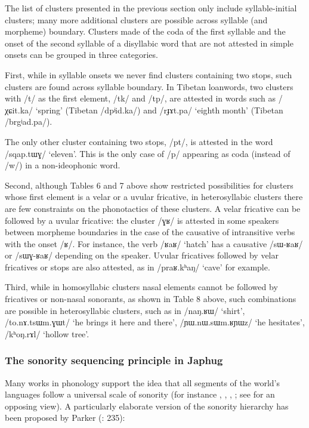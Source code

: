 \documentclass[12pt]{article}
\newcommand{\ipa}[1]{\mbox{\phon/#1/}}
\begin{document}
 The list of clusters presented in the previous section only include syllable-initial clusters; many more additional clusters are possible across syllable (and morpheme) boundary. Clusters made of the coda of the first syllable and the onset of the second syllable of a disyllabic word that are not attested in simple onsets can be grouped in three categories.
 
 First, while in syllable onsets we never find clusters containing two stops, such clusters are found across syllable boundary. In Tibetan loanwords, two clusters with \ipa{t} as the first element,  \ipa{tk} and \ipa{tp}, are attested in words such as \ipa{χɕit.ka} `spring' (Tibetan \ipa{dpʲid.ka}) and \ipa{rɟɤt.pa} `eighth month' (Tibetan \ipa{brgʲad.pa}). 
 
 The only  other cluster containing two stops, \ipa{pt}, is attested in the word  \ipa{sqap.tɯɣ} `eleven'. This is the only case of \ipa{p} appearing as coda (instead of \ipa{w}) in a non-ideophonic  word.
 
 Second, although Tables 6 and 7 above show restricted possibilities for clusters whose first element is a velar or a uvular fricative, in heterosyllabic clusters there are few constraints on the phonotactics of these clusters. A velar fricative can be followed by a uvular fricative:  the cluster \ipa{ɣʁ} is attested in some speakers between morpheme boundaries in the case of the causative of intransitive verbs with the onset \ipa{ʁ}. For instance, the verb \ipa{ʁaʁ} `hatch' has a causative \ipa{sɯ-ʁaʁ} or \ipa{sɯɣ-ʁaʁ} depending on the speaker. Uvular fricatives followed by velar fricatives or stops are also attested, as in \ipa{praʁ.kʰaŋ} `cave' for example.
 
Third, while in homosyllabic clusters nasal elements cannot be followed by fricatives or non-nasal sonorants, as shown in Table 8 above, such combinations are possible in heterosyllabic clusters, such as in \ipa{naŋ.ʁɯ} `shirt', \ipa{to.nɤ.tsɯm.ɣɯt} `he brings it here and there', \ipa{ɲɯ.nɯ.sɯm.ʁɲɯz} `he hesitates', \ipa{kʰoŋ.rɤl} `hollow tree'.

\subsubsection*{The sonority sequencing principle in Japhug}
Many works in phonology support the idea that all segments of the world's languages follow a universal scale of sonority (for instance \citealt{vennemann88syllable}, \citealt{blevins95syllable}, \citealt{parker02sonority}, \citealt{baroni14invariant}; see \citealt{ohala90sonority} for an opposing view). A particularly elaborate version of the sonority hierarchy has been proposed by Parker (\citeyear{parker02sonority}: 235):
\end{document}
